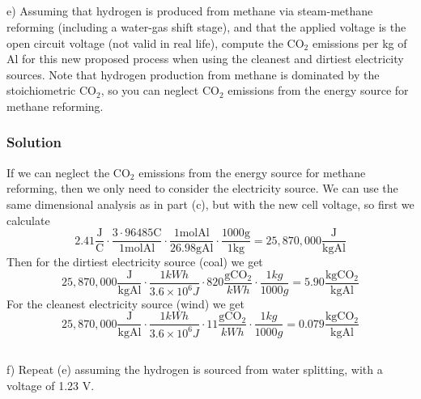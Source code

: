 \documentclass[12pt]{article}
\begin{document}
\subsection{}
e) Assuming that hydrogen is produced from methane via steam-methane reforming (including a water-gas shift stage), and that the applied voltage is the open circuit voltage (not valid in real life), compute the $\mathrm{CO}_{2}$ emissions per kg of Al for this new proposed process when using the cleanest and dirtiest electricity sources. Note that hydrogen production from methane is dominated by the stoichiometric $\mathrm{CO}_{2}$, so you can neglect $\mathrm{CO}_{2}$ emissions from the energy source for methane reforming.\\
\subsubsection{Solution}
If we can neglect the $\mathrm{CO}_{2}$ emissions from the energy source for methane reforming, then we only need to consider the electricity source. We can use the same dimensional analysis as in part (c), but with the new cell voltage, so first we calculate
\begin{equation}
    2.41 \frac{\mathrm{J}}{\mathrm{C}} \cdot \frac{3 \cdot 96485 \mathrm{C}}{1 \mathrm{mol} \mathrm{Al}} \cdot \frac{1 \mathrm{mol} \mathrm{Al}}{26.98 \mathrm{g} \mathrm{Al}} \cdot \frac{1000 \mathrm{g}}{1 \mathrm{kg}} = 25,870,000 \frac{\mathrm{J}}{\mathrm{kg} \mathrm{Al}}
\end{equation}
Then for the dirtiest electricity source (coal) we get
\begin{equation}
    25,870,000 \frac{\mathrm{J}}{\mathrm{kg} \mathrm{Al}} \cdot \frac{1 kWh}{3.6 \times 10^{6} J} \cdot 820 \frac{\mathrm{g} \mathrm{CO}_{2}}{kWh} \cdot \frac{1 kg}{1000 g} = 5.90 \frac{\mathrm{kg} \mathrm{CO}_{2}}{\mathrm{kg} \mathrm{Al}}
\end{equation}
For the cleanest electricity source (wind) we get
\begin{equation}
    25,870,000 \frac{\mathrm{J}}{\mathrm{kg} \mathrm{Al}} \cdot \frac{1 kWh}{3.6 \times 10^{6} J} \cdot 11 \frac{\mathrm{g} \mathrm{CO}_{2}}{kWh} \cdot \frac{1 kg}{1000 g} = 0.079 \frac{\mathrm{kg} \mathrm{CO}_{2}}{\mathrm{kg} \mathrm{Al}}
\end{equation}
\subsection{}
f) Repeat (e) assuming the hydrogen is sourced from water splitting, with a voltage of 1.23 V.\\
\end{document}
